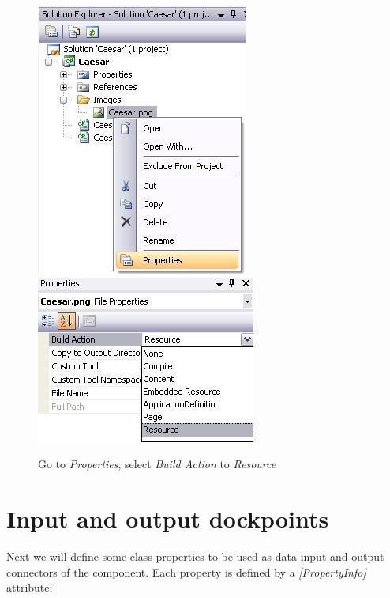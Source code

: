 \begin{figure}[h!]
	\centering
		\includegraphics{figures/icon_properties.jpg} \includegraphics{figures/icon_build_action.jpg}
	\caption{Go to \textit{Properties}, select \textit{Build Action} to \textit{Resource}}
	\label{fig:icon_properties}
\end{figure}

\section{Input and output dockpoints}
\label{sec:InputAndOutputDockpoints}

Next we will define some class properties to be used as data input and output connectors of the component. Each property is defined by a \textit{[PropertyInfo]} attribute:

